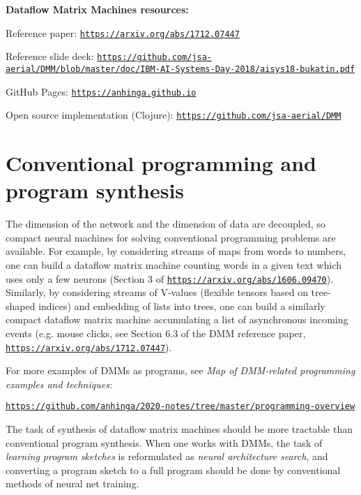 \documentclass{article}
\begin{document}
\vspace{0.1in}
\noindent
{\bf Dataflow Matrix Machines resources:}

Reference paper: \href{https://arxiv.org/abs/1712.07447}{\tt https://arxiv.org/abs/1712.07447}

Reference slide deck: \href{https://github.com/jsa-aerial/DMM/blob/master/doc/IBM-AI-Systems-Day-2018/aisys18-bukatin.pdf}{\scriptsize\tt https://github.com/jsa-aerial/DMM/blob/master/doc/IBM-AI-Systems-Day-2018/aisys18-bukatin.pdf}

GitHub Pages: \href{https://anhinga.github.io/}{\tt https://anhinga.github.io}

Open source implementation (Clojure): \href{https://github.com/jsa-aerial/DMM}{\tt https://github.com/jsa-aerial/DMM}

\section{Conventional programming and program synthesis} The dimension of the network and the dimension
of data are decoupled, so compact neural machines for solving conventional programming problems are available.
For example, by considering streams of maps from words to numbers, one can build a dataflow matrix machine
counting words in a given text which uses only a few neurons 
(Section 3 of \href{https://arxiv.org/abs/1606.09470}{\tt https://arxiv.org/abs/1606.09470}).
Similarly, by considering streams of V-values  (flexible tensors based on tree-shaped indices) and embedding
of lists into trees, one can build a similarly compact dataflow matrix machine
accumulating a list of asynchronous incoming events
(e.g. mouse clicks, see Section 6.3 of the DMM reference paper, \href{https://arxiv.org/abs/1712.07447}{\tt https://arxiv.org/abs/1712.07447}). 

For more examples of DMMs as programs, see {\em Map of DMM-related programming examples and techniques}: 

\hspace{0.3in}\href{https://github.com/anhinga/2020-notes/tree/master/programming-overview}{\tt https://github.com/anhinga/2020-notes/tree/master/programming-overview}

\vspace{0.1in}

The task of synthesis of dataflow matrix machines
should be more tractable than conventional program synthesis. When one works with DMMs, the task of
{\em learning program sketches} is reformulated as {\em neural architecture search},
and converting a program sketch to a full program should be done by
conventional methods of neural net training. 
\end{document}
